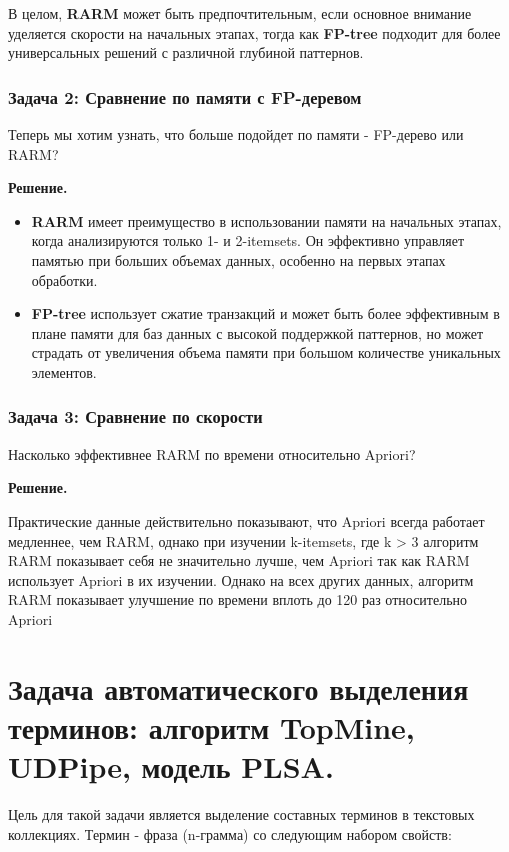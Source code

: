 В целом, \textbf{RARM} может быть предпочтительным, если основное внимание уделяется скорости на начальных этапах, тогда как \textbf{FP-tree} подходит для более универсальных решений с различной глубиной паттернов.


\subsubsection{Задача 2: Сравнение по памяти с FP-деревом} Теперь мы хотим узнать, что больше подойдет по памяти - FP-дерево или RARM?

\textbf{Решение.}

\begin{itemize}
    \item \textbf{RARM} имеет преимущество в использовании памяти на начальных этапах, когда анализируются только 1- и 2-itemsets. Он эффективно управляет памятью при больших объемах данных, особенно на первых этапах обработки.
    \item \textbf{FP-tree} использует сжатие транзакций и может быть более эффективным в плане памяти для баз данных с высокой поддержкой паттернов, но может страдать от увеличения объема памяти при большом количестве уникальных элементов.
\end{itemize}

\subsubsection{Задача 3: Сравнение по скорости} Насколько эффективнее RARM по времени относительно Apriori?

\textbf{Решение.}

Практические данные действительно показывают, что Apriori всегда работает медленнее, чем RARM, однако при изучении k-itemsets, где k > 3 алгоритм RARM показывает себя не значительно лучше, чем Apriori так как RARM использует Apriori в их изучении. Однако на всех других данных, алгоритм RARM показывает улучшение по времени вплоть до 120 раз относительно Apriori



\section{Задача автоматического выделения терминов: алгоритм TopMine, UDPipe, модель PLSA.}

Цель для такой задачи является выделение составных терминов в текстовых коллекциях. Термин - фраза (n-грамма) со следующим набором свойств:

